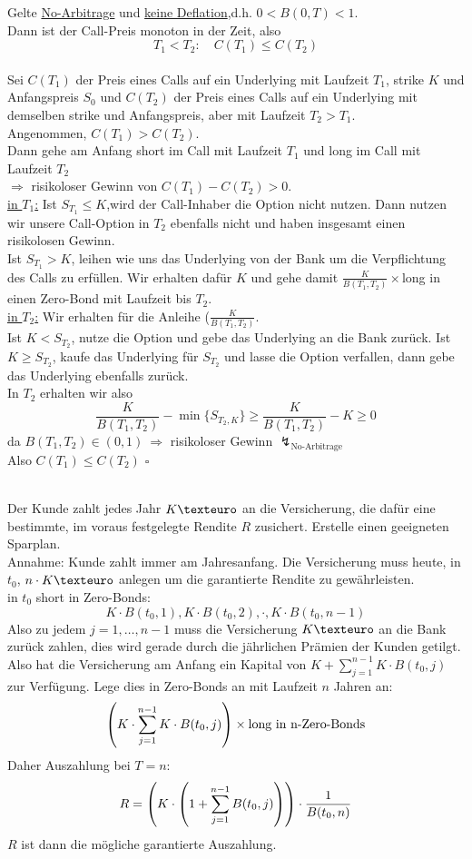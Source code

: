 Gelte \uline{No-Arbitrage} und \uline{keine Deflation},d.h. $0<B(0,T)<1$.\\
Dann ist der Call-Preis monoton in der Zeit, also \[ T_1<T_2:\quad C(T_1)\le C(T_2) \]
\\
Sei $C(T_1)$ der Preis eines Calls auf ein Underlying mit Laufzeit $T_1$, strike $K$ und Anfangspreis $S_0$ und $C(T_2)$ der Preis eines Calls auf ein Underlying mit demselben strike und Anfangspreis, aber mit Laufzeit $T_2>T_1$.\\
Angenommen, $C(T_1)>C(T_2)$.\\
Dann gehe am Anfang short im Call mit Laufzeit $T_1$ und long im Call mit Laufzeit $T_2$\\
$\Rightarrow$ risikoloser Gewinn von $C(T_1)-C(T_2)>0$.\\
\uline{in $T_1$:} Ist $S_{T_1}\le K$,wird der Call-Inhaber die Option nicht nutzen. Dann nutzen wir unsere Call-Option in $T_2$ ebenfalls nicht und haben insgesamt einen risikolosen Gewinn.\\
Ist $S_{T_1}>K$, leihen wie uns das Underlying von der Bank um die Verpflichtung des Calls zu erfüllen. Wir erhalten dafür $K$ und gehe damit $\frac{K}{B(T_1,T_2)}\times$long in einen Zero-Bond mit Laufzeit bis $T_2$.\\
\uline{in $T_2$:} Wir erhalten für die Anleihe ($\frac{K}{B(T_1,T_2)}$.\\
Ist $K<S_{T_2}$, nutze die Option und gebe das Underlying an die Bank zurück. Ist $K\ge S_{T_2}$, kaufe das Underlying für $S_{T_2}$ und lasse die Option verfallen, dann gebe das Underlying ebenfalls zurück.\\
In $T_2$ erhalten wir also \[ \frac{K}{B(T_1,T_2)}-\min\{S_{T_2,K}\}\ge \frac{K}{B(T_1,T_2)}-K\ge 0\]
da $B(T_1,T_2)\in (0,1)~\Rightarrow$ risikoloser Gewinn $\lightning_{\text{No-Arbitrage}}$\\
Also $C(T_1)\le C(T_2)$
\hfill $\square$

\\
Der Kunde zahlt jedes Jahr $K \texteuro$ an die Versicherung, die dafür eine bestimmte, im voraus festgelegte Rendite $R$ zusichert. Erstelle einen geeigneten Sparplan.\\
Annahme: Kunde zahlt immer am Jahresanfang. Die Versicherung muss heute, in $t_0$, $n\cdot K \texteuro$ anlegen um die garantierte Rendite zu gewährleisten.\\
in $t_0$ short in Zero-Bonds: \[ K\cdot B(t_0,1), K\cdot B(t_0,2), \cdot, K\cdot B(t_0,n-1) \]
Also zu jedem $j=1,\dots,n-1$ muss die Versicherung $K\texteuro$ an die Bank zurück zahlen, dies wird gerade durch die jährlichen Prämien der Kunden getilgt.\\
Also hat die Versicherung am Anfang ein Kapital von $K+\sum_{j=1}^{n-1}K\cdot B(t_0,j)$ zur Verfügung. Lege dies in Zero-Bonds an mit Laufzeit $n$ Jahren an: \[ \left( K\cdot \sum_{j=1}^{n-1}K\cdot B(t_0,j)\right)\times \text{long in n-Zero-Bonds} \]
Daher Auszahlung bei $T=n$: \[ R=\left( K\cdot \left( 1+\sum_{j=1}^{n-1}B(t_0,j)\right)\right)\cdot \frac{1}{B(t_0,n)} \]
$R$ ist dann die mögliche garantierte Auszahlung.


\cleardoubleoddemptypage
{}
\setcounter{page}{1}


\printindex
\listoffigures

